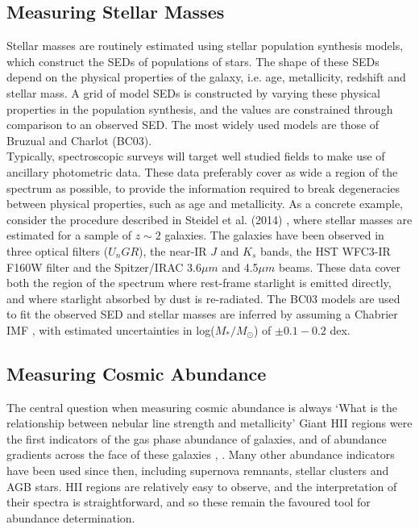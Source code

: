 \documentclass{literature}
\begin{document}
\subsection{Measuring Stellar Masses}
Stellar masses are routinely estimated using stellar population synthesis models, which construct the SEDs of populations of stars. The shape of these SEDs depend on the physical properties of the galaxy, i.e. age, metallicity, redshift and stellar mass. A grid of model SEDs is constructed by varying these physical properties in the population synthesis, and the values are constrained through comparison to an observed SED. The most widely used models are those of Bruzual and Charlot \citep{Bruzual2003} (BC03). \\      
Typically, spectroscopic surveys will target well studied fields to make use of ancillary photometric data. These data preferably cover as wide a region of the spectrum as possible, to provide the information required to break degeneracies between physical properties, such as age and metallicity. As a concrete example, consider the procedure described in Steidel et al. (2014) \citep{Steidel2014}, where stellar masses are estimated for a sample of $z \sim 2$ galaxies. The galaxies have been observed in three optical filters (\textit{$U_{n}GR$}), the near-IR  $ J $ and $ K_{s}$ bands, the HST WFC3-IR F160W filter and the Spitzer/IRAC 3.6$\mu m$ and 4.5$\mu m$ beams. These data cover both the region of the spectrum where rest-frame starlight is emitted directly, and where starlight absorbed by dust is re-radiated. The BC03 models are used to fit the observed SED and stellar masses are inferred by assuming a Chabrier IMF \citep{Chabrier2003}, with estimated uncertainties in log($M_{*} /M_{\odot}$) of $\pm 0.1-0.2 $ dex.    

\subsection{Measuring Cosmic Abundance}\label{subsec:abundance}
The central question when measuring cosmic abundance is always `What is the relationship between nebular line strength and metallicity'
Giant HII regions were the first indicators of the gas phase abundance of galaxies, and of abundance gradients across the face of these galaxies \citep{Searle1971}, \citep{Shields1974}. Many other abundance indicators have been used since then, including supernova remnants, stellar clusters and AGB stars. HII regions are relatively easy to observe, and the interpretation of their spectra is straightforward, and so these remain the favoured tool for abundance determination.  \\
\end{document}

